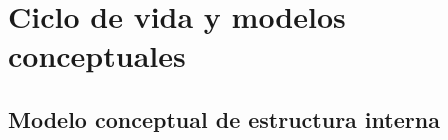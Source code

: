 
\section{Ciclo de vida y modelos conceptuales}\label{sec:tb_evolucion}

\subsection{Modelo conceptual de estructura interna}\label{subsec:tb_modelos}

%
